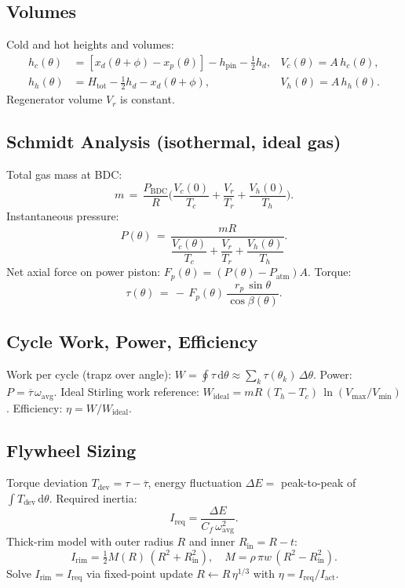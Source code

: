 \documentclass[11pt]{article}
\begin{document}
\subsection*{Volumes}
Cold and hot heights and volumes:
\begin{align}
 h_c(\theta) &= [x_d(\theta+\phi)-x_p(\theta)] - h_{\text{pin}} - \tfrac{1}{2}h_d, & V_c(\theta) = A\,h_c(\theta),\\
 h_h(\theta) &= H_{\text{tot}} - \tfrac{1}{2}h_d - x_d(\theta+\phi), & V_h(\theta) = A\,h_h(\theta).
\end{align}
Regenerator volume $V_r$ is constant.

\subsection*{Schmidt Analysis (isothermal, ideal gas)}
Total gas mass at BDC:
\[ m \,=\, \frac{P_{\text{BDC}}}{R}\Big( \frac{V_c(0)}{T_c} + \frac{V_r}{T_r} + \frac{V_h(0)}{T_h} \Big). \]
Instantaneous pressure:
\[ P(\theta) \,=\, \frac{mR}{\dfrac{V_c(\theta)}{T_c}+\dfrac{V_r}{T_r}+\dfrac{V_h(\theta)}{T_h}}. \]
Net axial force on power piston: $F_p(\theta)=(P(\theta)-P_{\text{atm}})A$. Torque:
\[ \tau(\theta) \,=\, -\,F_p(\theta)\,\frac{r_p\,\sin\theta}{\cos\beta(\theta)}. \]

\subsection*{Cycle Work, Power, Efficiency}
Work per cycle (trapz over angle): $W = \oint \tau\,\mathrm{d}\theta \approx \sum_k \tau(\theta_k)\,\Delta\theta$. Power: $P = \overline{\tau}\,\omega_{\text{avg}}$. Ideal Stirling work reference: $W_{\text{ideal}} = mR\,(T_h-T_c)\,\ln(V_{\max}/V_{\min})$. Efficiency: $\eta = W/W_{\text{ideal}}$.

\subsection*{Flywheel Sizing}
Torque deviation $T_{\text{dev}} = \tau - \overline{\tau}$, energy fluctuation $\Delta E =$ peak-to-peak of $\int T_{\text{dev}}\,\mathrm{d}\theta$. Required inertia:
\[ I_{\text{req}} = \frac{\Delta E}{C_f\,\omega_{\text{avg}}^2}. \]
Thick-rim model with outer radius $R$ and inner $R_{\text{in}}=R-t$:
\[ I_{\text{rim}} = \tfrac{1}{2}M(R)\,(R^2+R_{\text{in}}^2),\quad M=\rho\,\pi w\,(R^2-R_{\text{in}}^2). \]
Solve $I_{\text{rim}}=I_{\text{req}}$ via fixed-point update $R\leftarrow R\,\eta^{1/3}$ with $\eta=I_{\text{req}}/I_{\text{act}}$.
\end{document}
